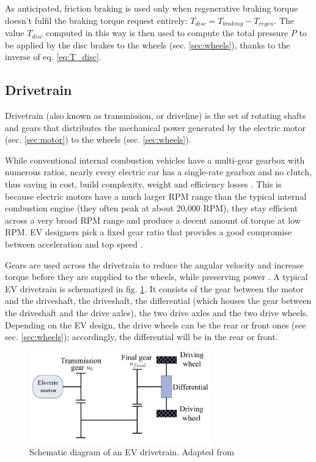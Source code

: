 As anticipated, friction braking is used only when regenerative braking torque doesn't fulfil the braking torque request entirely: $T_{disc} = T_{braking} - T_{regen}$. The value $T_{disc}$ computed in this way is then used to compute the total pressure $P$ to be applied by the disc brakes to the wheels (sec. \ref{sec:wheels}), thanks to the inverse of eq. \ref{eq:T_disc}.



\subsection{Drivetrain}
\label{sec:drivetrain}
Drivetrain (also known as transmission, or driveline) is the set of rotating shafts and gears that distributes the mechanical power generated by the electric motor (sec. \ref{sec:motor}) to the wheels (sec. \ref{sec:wheels}).

While conventional internal combustion vehicles have a multi-gear gearbox with numerous ratios, nearly every electric car has a single-rate gearbox and no clutch, thus saving in cost, build complexity, weight and efficiency losses \cite{single_gear_ratio, ehsani_ev_book}. This is because electric motors have a much larger RPM range than the typical internal combustion engine (they often peak at about 20,000 RPM), they stay efficient across a very broad RPM range and produce a decent amount of torque at low RPM. EV designers pick a fixed gear ratio that provides a good compromise between acceleration and top speed \cite{single_gear_ratio}.

Gears are used across the drivetrain to reduce the angular velocity and increase torque before they are supplied to the wheels, while preserving power \cite{gear_trains}. A typical EV drivetrain is schematized in fig. \ref{fig:ev_drivetrain}. It consists of the gear between the motor and the driveshaft, the driveshaft, the differential (which houses the gear between the driveshaft and the drive axles), the two drive axles and the two drive wheels. Depending on the EV design, the drive wheels can be the rear or front ones (see sec. \ref{sec:wheels}); accordingly, the differential will be in the rear or front.

\begin{figure}[htb]
    \centering
    \includegraphics[width=0.7\textwidth]{images/ev_drivetrain}
    \caption[Drivetrain of an EV]{Schematic diagram of an EV drivetrain. Adapted from \cite{ev_drivetrain_schematic}}
    \label{fig:ev_drivetrain}
\end{figure}

